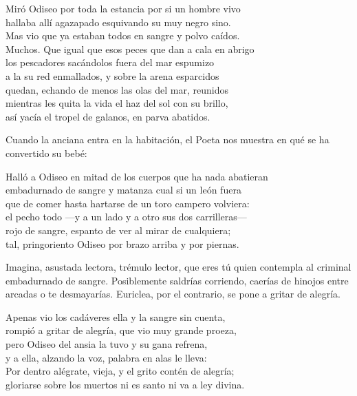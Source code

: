 \begin{versocita}
Miró Odiseo por toda la estancia por si un hombre vivo\\
hallaba allí agazapado esquivando su muy negro sino.\\
Mas vio que ya estaban todos en sangre y polvo caídos.\\
Muchos. Que igual que esos peces que dan a cala en abrigo\\
los pescadores sacándolos fuera del mar espumizo\\
a la su red enmallados, y sobre la arena esparcidos\\
quedan, echando de menos las olas del mar, reunidos\\
mientras les quita la vida el haz del sol con su brillo,\\
así yacía el tropel de galanos, en parva abatidos.
\end{versocita}

Cuando la anciana entra en la habitación, el Poeta nos muestra en qué se ha convertido su bebé:

\begin{versocita}
Halló a Odiseo en mitad de los cuerpos que ha nada abatieran\\
embadurnado de sangre y matanza cual si un león fuera\\
que de comer hasta hartarse de un toro campero volviera:\\
el pecho todo ---y a un lado y a otro sus dos carrilleras---\\
rojo de sangre, espanto de ver al mirar de cualquiera;\\
tal, pringoriento Odiseo por brazo arriba y por piernas.
\end{versocita}

Imagina, asustada lectora, trémulo lector, que eres tú quien contempla al criminal embadurnado de sangre. Posiblemente saldrías corriendo, caerías de hinojos entre arcadas o te desmayarías. Euriclea, por el contrario, se pone a gritar de alegría.

\begin{versocita}
Apenas vio los cadáveres ella y la sangre sin cuenta,\\
rompió a gritar de alegría, que vio muy grande proeza,\\
pero Odiseo del ansia la tuvo y su gana refrena,\\
y a ella, alzando la voz, palabra en alas le lleva:\\
Por dentro alégrate, vieja, y el grito contén de alegría;\\
gloriarse sobre los muertos ni es santo ni va a ley divina.
\end{versocita}

